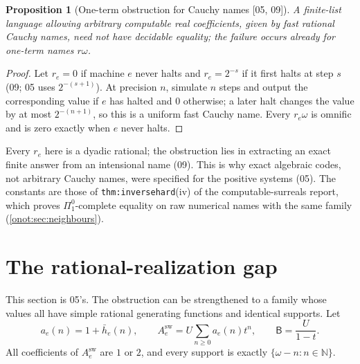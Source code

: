 \documentclass[11pt,oneside]{article}
\numberwithin{equation}{section}
\newtheorem{proposition}[proposition]{Proposition}
\theoremstyle{definition}
\theoremstyle{remark}
\newcommand{\N}{\mathbb N}
\newcommand{\sB}{\mathsf B}
\newcommand{\hb}{\bar h}
\newcommand{\src}[1]{\textup{\textsf{\small[#1]}}}
\newcommand{\replabel}[1]{\nolinkurl{#1}}
\begin{document}
\begin{proposition}[One-term obstruction for Cauchy names \src{05, 09}]\label{onot:neg:prop:realcoeff}
A finite-list language allowing arbitrary computable real coefficients, given by
fast rational Cauchy names, need not have decidable equality; the failure occurs
already for one-term names $r\omega$.
\end{proposition}
\begin{proof}
Let $r_e=0$ if machine $e$ never halts and $r_e=2^{-s}$ if it first halts at step
$s$ (09; 05 uses $2^{-(s+1)}$). At precision $n$, simulate $n$ steps and output the
corresponding value if $e$ has halted and $0$ otherwise; a later halt changes the
value by at most $2^{-(n+1)}$, so this is a uniform fast Cauchy name. Every
$r_e\omega$ is omnific and is zero exactly when $e$ never halts.
\end{proof}
Every $r_e$ here is a dyadic rational; the obstruction lies in extracting an exact
finite answer from an intensional name (09). This is why exact algebraic codes,
not arbitrary Cauchy names, were specified for the positive systems (05). The
constants are those of \replabel{thm:inversehard}(iv) of the computable-surreals
report, which proves $\Pi^0_1$-complete equality on raw numerical names with the
same family (\cref{onot:sec:neighbours}).

\section{The rational-realization gap}\label{onot:neg:sec:rational}

This section is 05's. The obstruction can be strengthened to a family whose values
all have simple rational generating functions and identical supports. Let
\begin{equation}\label{onot:neg:eq:switch}
 a_e(n)=1+\hb_e(n),\qquad A^{\mathrm{sw}}_e=U\sum_{n\ge0}a_e(n)t^n,\qquad \sB=\frac U{1-t}.
\end{equation}
All coefficients of $A^{\mathrm{sw}}_e$ are $1$ or $2$, and every support is
exactly $\{\omega-n:n\in\N\}$.
\end{document}
